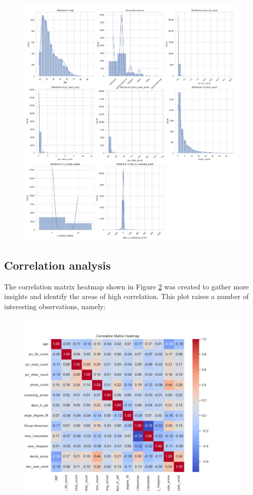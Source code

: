 \begin{figure}[H]
	\centering
	\includegraphics[width=0.9\linewidth]{img/distribution-plots}
	\caption{}
	\label{fig:distribution-plots}
\end{figure}


\subsection{Correlation analysis}

The correlation matrix heatmap shown in Figure \ref{fig:correlationmatrixheatmap} was created to gather more insights and identify the areas of high correlation. This plot raises a number of interesting observations, namely:

\begin{figure}[!h]
	\centering
	\includegraphics[width=0.7\linewidth]{img/correlation_matrix_heatmap}
	\caption{}
	\label{fig:correlationmatrixheatmap}
\end{figure}


